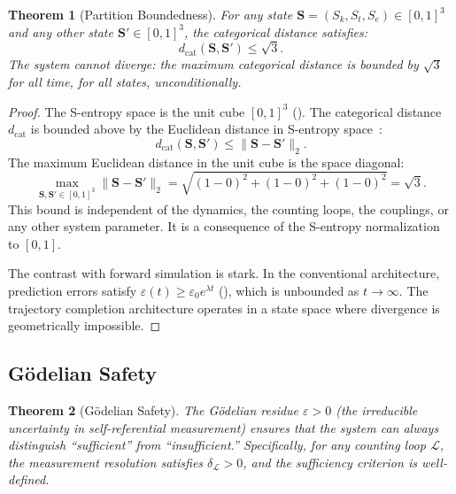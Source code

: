 \documentclass[twocolumn,10pt]{article}
\newtheorem{theorem}{Theorem}[section]
\theoremstyle{definition}
\newcommand{\Sentropy}{\mathbf{S}}
\newcommand{\Sk}{S_k}
\newcommand{\St}{S_t}
\newcommand{\Se}{S_e}
\newcommand{\dcat}{d_{\mathrm{cat}}}
\begin{document}
\begin{theorem}[Partition Boundedness]
\label{thm:partition-bounded}
For any state $\Sentropy = (\Sk, \St, \Se) \in [0,1]^3$ and any other state $\Sentropy' \in [0,1]^3$, the categorical distance satisfies:
\begin{equation}
\dcat(\Sentropy, \Sentropy') \leq \sqrt{3}.
\end{equation}
The system cannot diverge: the maximum categorical distance is bounded by $\sqrt{3}$ for all time, for all states, unconditionally.
\end{theorem}

\begin{proof}
The S-entropy space is the unit cube $[0,1]^3$ (). The categorical distance $\dcat$ is bounded above by the Euclidean distance in S-entropy space~\cite{sachikonye2026trajectory}:
\[
\dcat(\Sentropy, \Sentropy') \leq \|\Sentropy - \Sentropy'\|_2.
\]
The maximum Euclidean distance in the unit cube is the space diagonal:
\[
\max_{\Sentropy, \Sentropy' \in [0,1]^3} \|\Sentropy - \Sentropy'\|_2 = \sqrt{(1-0)^2 + (1-0)^2 + (1-0)^2} = \sqrt{3}.
\]
This bound is independent of the dynamics, the counting loops, the couplings, or any other system parameter. It is a consequence of the S-entropy normalization to $[0,1]$.

The contrast with forward simulation is stark. In the conventional architecture, prediction errors satisfy $\varepsilon(t) \geq \varepsilon_0 e^{\lambda t}$ (), which is unbounded as $t \to \infty$. The trajectory completion architecture operates in a state space where divergence is geometrically impossible.
\end{proof}

\subsection{G\"{o}delian Safety}

\begin{theorem}[G\"{o}delian Safety]
\label{thm:godelian-safety}
The G\"{o}delian residue $\varepsilon > 0$ (the irreducible uncertainty in self-referential measurement) ensures that the system can always distinguish ``sufficient'' from ``insufficient.'' Specifically, for any counting loop $\mathcal{L}$, the measurement resolution satisfies $\delta_{\mathcal{L}} > 0$, and the sufficiency criterion is well-defined.
\end{theorem}
\end{document}
